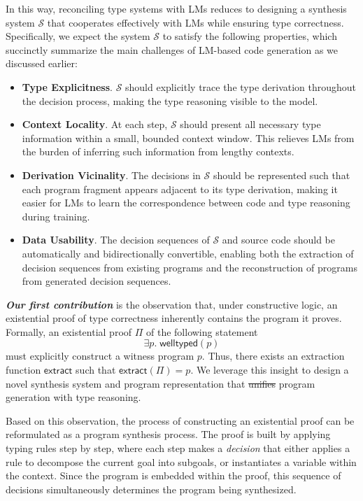 \documentclass[manuscript,screen]{acmart}
\makeatletter
\providecommand{\DIFadd}[1]{{\protect\color{blue}\uwave{#1}}} %
\providecommand{\DIFdel}[1]{{\protect\color{red}\sout{#1}}} %
\providecommand{\DIFaddbegin}{} %
\providecommand{\DIFaddend}{} %
\providecommand{\DIFdelbegin}{} %
\providecommand{\DIFdelend}{} %
\providecommand{\DIFscaledelfig}{0.5}
\newlength{\DIFdelgraphicswidth} %
\newlength{\DIFdelgraphicsheight} %
\providecommand{\DIFaddincludegraphics}[2][]{{\color{blue}\fbox{\DIFOincludegraphics[#1]{#2}}}} %
\providecommand{\DIFdelincludegraphics}[2][]{%
\sbox{\DIFdelgraphicsbox}{\DIFOincludegraphics[#1]{#2}}%
\settoboxwidth{\DIFdelgraphicswidth}{\DIFdelgraphicsbox} %
\settoboxtotalheight{\DIFdelgraphicsheight}{\DIFdelgraphicsbox} %
\scalebox{\DIFscaledelfig}{%
\parbox[b]{\DIFdelgraphicswidth}{\usebox{\DIFdelgraphicsbox}\\[-\baselineskip] \rule{\DIFdelgraphicswidth}{0em}}\llap{\resizebox{\DIFdelgraphicswidth}{\DIFdelgraphicsheight}{%
\setlength{\unitlength}{\DIFdelgraphicswidth}%
\begin{picture}(1,1)%
\thicklines\linethickness{2pt} %
{\color[rgb]{1,0,0}\put(0,0){\framebox(1,1){}}}%
{\color[rgb]{1,0,0}\put(0,0){\line( 1,1){1}}}%
{\color[rgb]{1,0,0}\put(0,1){\line(1,-1){1}}}%
\end{picture}%
}\hspace*{3pt}}} %
} %
\DeclareRobustCommand{\DIFaddbegin}{\DIFOaddbegin \let\includegraphics\DIFaddincludegraphics} %
\DeclareRobustCommand{\DIFaddend}{\DIFOaddend \let\includegraphics\DIFOincludegraphics} %
\DeclareRobustCommand{\DIFdelbegin}{\DIFOdelbegin \let\includegraphics\DIFdelincludegraphics} %
\DeclareRobustCommand{\DIFdelend}{\DIFOaddend \let\includegraphics\DIFOincludegraphics} %
\let\sout@orig\sout %
\renewcommand{\sout}[1]{\ifmmode\text{\sout@orig{\ensuremath{#1}}}\else\sout@orig{#1}\fi} %
\makeatother
\begin{document}
In this way, reconciling type systems with LMs reduces to designing a synthesis system $\mathcal S$ that cooperates effectively with LMs while ensuring type correctness.
Specifically, we expect the system $\mathcal S$ to satisfy the following properties, which succinctly summarize the main challenges of LM-based code generation as we discussed earlier:
\begin{itemize}
 \item \textbf{Type Explicitness}. $\mathcal{S}$ should explicitly trace the type derivation throughout the decision process, making the type reasoning visible to the model.
 \item \textbf{Context Locality}. At each step, $\mathcal{S}$ should present all necessary type information within a small, bounded context window. This relieves LMs from the burden of inferring such information from lengthy contexts.
 \item \textbf{Derivation Vicinality}. The decisions in $\mathcal{S}$ should be represented such that each program fragment appears adjacent to its type derivation, making it easier for LMs to learn the correspondence between code and type reasoning during training.
 \item \textbf{Data Usability}. The decision sequences of $\mathcal{S}$ and source code should be automatically and bidirectionally convertible, enabling both the extraction of decision sequences from existing programs and the reconstruction of programs from generated decision sequences.
\end{itemize}

\textbf{\textit{Our first contribution}} is the observation that, under constructive logic, an existential proof of type correctness inherently contains the program it proves. Formally, an existential proof $\Pi$ of the following statement
\[
\exists p.\; \mathsf{welltyped}(p)
\]
must explicitly construct a witness program $p$. Thus, there exists an extraction function $\mathsf{extract}$ such that $\mathsf{extract}(\Pi) = p$. We leverage this insight to design a novel synthesis system and program representation that \DIFdelbegin \DIFdel{unifies }\DIFdelend \DIFaddbegin \DIFadd{unify }\DIFaddend program generation with type reasoning.

Based on this observation, the process of constructing an existential proof can be reformulated as a program synthesis process. The proof is built by applying typing rules step by step, where each step makes a \textit{decision} that either applies a rule to decompose the current goal into subgoals, or instantiates a variable within the context. Since the program is embedded within the proof, this sequence of decisions simultaneously determines the program being synthesized.
\end{document}
